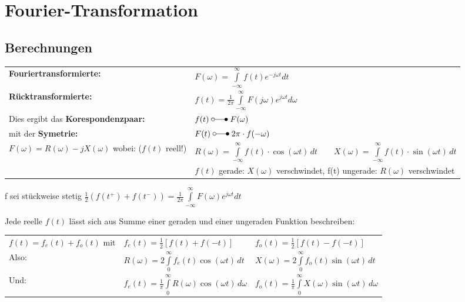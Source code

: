 \section{Fourier-Transformation}
	\subsection{Berechnungen}%
		\begin{tabular}{|p{6cm} l|} \hline
			\textbf{Fouriertransformierte:} &
			$F(\omega) = \int\limits_{-\infty}^{\infty} f(t)e^{-j\omega t}dt$ \\
			\textbf{Rücktransformierte:} &
			$f(t) = \frac{1}{2\pi}\int\limits_{-\infty}^{\infty}F(j\omega)e^{j\omega t}d\omega$ \\ \hline
		
		Dies ergibt das \textbf{Korespondenzpaar:} & $f(t) \; \laplace \; F(\omega)$ \\
		mit der \textbf{Symetrie:} & $F(t) \; \laplace \; 2\pi \cdot f(-\omega)$ \\
		
		$F(\omega) = R(\omega) -jX(\omega)$ wobei: ($f(t)$ reell!) &
		$R(\omega) = \int\limits_{-\infty}^\infty f(t)\cdot \cos(\omega t)\,dt \quad\quad X(\omega) =
		\int\limits_{-\infty}^\infty f(t)\cdot \sin(\omega t)\,dt$
		\\
		&$f(t)$ gerade: $X(\omega)$ verschwindet, f(t) ungerade: $R(\omega)$ verschwindet \\
		\hline
		\end{tabular}
		
		f sei stückweise stetig $\frac{1}{2}(f(t^+) + f(t^-)) = \frac{1}{2\pi} \int\limits_{-\infty}^{\infty}F(\omega)e^{j\omega t} dt$
		
		Jede reelle $f(t)$ lässt sich aus Summe einer geraden und einer ungeraden Funktion beschreiben:\\[3mm]
		\begin{tabular}{lll}
			$f(t) = f_e(t) + f_o(t)$ mit & $f_e(t) = \frac{1}{2}[f(t) + f(-t)]$ & $f_o(t) = \frac{1}{2}[f(t) - f(-t)]$ \\[3mm]
			
			Also: & $R(\omega) = 2 \int\limits_0^\infty f_e(t) \cos(\omega t)\,dt$ & $X(\omega) = 2 \int\limits_0^\infty
			f_o(t) \sin(\omega t)\,dt$ \\[3mm]
			
			Und: & $f_e(t) = \frac{1}{\pi}\int\limits_0^\infty R(\omega)\cos(\omega t)\,d\omega$ & 
			$f_o(t) = \frac{1}{\pi}\int\limits_0^\infty X(\omega)\sin(\omega t)\,d\omega$ \\[3mm]
		\end{tabular}
		
